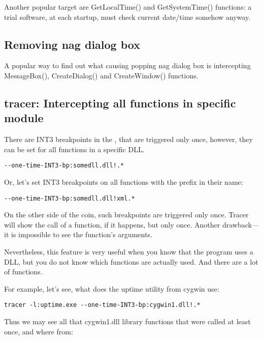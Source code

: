 Another popular target are GetLocalTime() and GetSystemTime() functions:
a trial software, at each startup, must check current date/time somehow anyway.

\subsection{Removing nag dialog box}

A popular way to find out what causing popping nag dialog box is intercepting MessageBox(), 
CreateDialog() and CreateWindow() functions.

\subsection{tracer: Intercepting all functions in specific module}

There are INT3 breakpoints in the \tracer, that are triggered only once, however, they can be set for all functions
in a specific DLL.

\begin{lstlisting}
--one-time-INT3-bp:somedll.dll!.*
\end{lstlisting}

Or, let's set INT3 breakpoints on all functions with the  prefix in their name:

\begin{lstlisting}
--one-time-INT3-bp:somedll.dll!xml.*
\end{lstlisting}

On the other side of the coin, such breakpoints are triggered only once.
Tracer will show the call of a function, if it happens, but only once.
Another drawback---it is impossible to see the function's arguments.

Nevertheless, this feature is very useful when you know that the program uses a DLL,
but you do not know which functions are actually used.
And there are a lot of functions. 

\par
{}
For example, let's see, what does the uptime utility from cygwin use:

\begin{lstlisting}
tracer -l:uptime.exe --one-time-INT3-bp:cygwin1.dll!.*
\end{lstlisting}

Thus we may see all that cygwin1.dll library functions that were called at least once, and where from:




